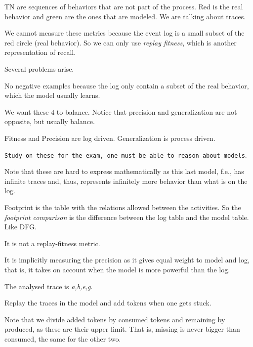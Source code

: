\nextslides[slide=,until=,highlight=]

TN are sequences of behaviors that are not part of the process. Red is the real behavior and green are the ones that are modeled. We are talking about traces.

\nextslides[slide=,until=28,highlight=28]

We cannot measure these metrics because the event log is a small subset of the red circle (real behavior). So we can only use \emph{replay fitness}, which is another representation of recall.

\nextslides

Several problems arise.

No negative examples because the log only contain a subset of the real behavior, which the model usually learns.

\nextslides

We want these 4 to balance. Notice that precision and generalization are not opposite, but usually balance.

Fitness and Precision are log driven. Generalization is process driven.

\nextslides[slide=,until=35,highlight=35]

\texttt{Study on these for the exam, one must be able to reason about models}.

Note that these are hard to express mathematically as this last model, f.e., has infinite traces and, thus, represents infinitely more behavior than what is on the log.

\nextslides[slide=38,until=,highlight=]

\nextslides[slide=,until=43,highlight=43]

Footprint is the table with the relations allowed between the activities. So the \emph{footprint comparison} is the difference between the log table and the model table. Like DFG.

\nextslides[until=47,highlight=47]

It is not a replay-fitness metric.

It is implicitly measuring the precision as it gives equal weight to model and log, that is, it takes on account when the model is more powerful than the log.

\nextslides[slide=,until=,highlight=]

The analysed trace is \emph{a,b,e,g}.

Replay the traces in the model and add tokens when one gets stuck.

Note that we divide added tokens by consumed tokens and remaining by produced, as these are their upper limit. That is, missing is never bigger than consumed, the same for the other two.

